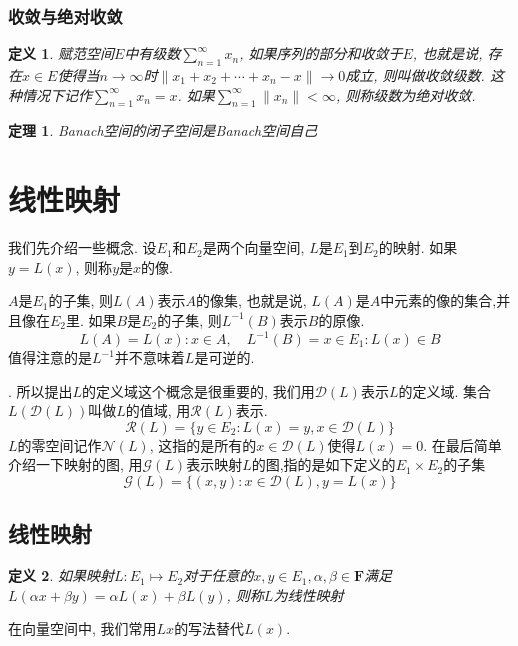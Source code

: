 \documentclass[a4paper,11pt]{book}
\newtheorem{definition}{\hspace{2em}定义}[section]
\newtheorem{theorem}{\hspace{2em}定理}[section]
\begin{document}
\subsubsection*{收敛与绝对收敛}
\begin{definition}
  赋范空间$E$中有级数$\sum_{n=1}^{\infty}x_n$, 如果序列的部分和收敛于$E$, 也就是说, 存在$x\in E$使得当$n\to\infty$时$\|x_1+x_2+\cdots+x_n-x\|\to0$成立, 则叫做收敛级数. 这种情况下记作$\sum_{n=1}^{\infty}x_n=x$. 如果$\sum_{n=1}^{\infty}\|x_n\|<\infty$, 则称级数为绝对收敛.
\end{definition}
\begin{theorem}
  Banach空间的闭子空间是Banach空间自己
\end{theorem}
\section{线性映射}
我们先介绍一些概念. 设$E_1$和$E_2$是两个向量空间, $L$是$E_1$到$E_2$的映射. 如果$y=L(x)$, 则称$y$是$x$的像.

$A$是$E_1$的子集, 则$L(A)$表示$A$的像集, 也就是说, $L(A)$是$A$中元素的像的集合,并且像在$E_2$里. 如果$B$是$E_2$的子集, 则$L^{-1}(B)$表示$B$的原像.
\begin{equation*}
  L(A)={L(x):x\in A},\quad L^{-1}(B)={x\in E_1:L(x)\in B}
\end{equation*}
值得注意的是$L^{-1}$并不意味着$L$是可逆的.

. 所以提出$L$的定义域这个概念是很重要的, 我们用$\mathcal{D}(L)$表示$L$的定义域. 集合$L(\mathcal{D}(L))$叫做$L$的值域, 用$\mathcal{R}(L)$表示.
\begin{equation*}
  \mathcal{R}(L)=\{y\in E_2:L(x)=y,x\in\mathcal{D}(L)\}
\end{equation*}
$L$的零空间记作$\mathcal{N}(L)$, 这指的是所有的$x\in \mathcal{D}(L)$使得$L(x)=0$. 在最后简单介绍一下映射的图, 用$\mathcal{G}(L)$表示映射$L$的图,指的是如下定义的$E_1\times E_2$的子集
\begin{equation*}
  \mathcal{G}(L)=\{(x,y):x\in\mathcal{D}(L),y=L(x)\}
\end{equation*}
\subsection*{线性映射}
\begin{definition}
  如果映射$L:E_1\mapsto E_2$对于任意的$x,y\in E_1,\alpha,\beta\in \mathbf{F}$满足$L(\alpha x+\beta y)=\alpha L(x)+\beta L(y)$, 则称$L$为线性映射
\end{definition}
在向量空间中, 我们常用$Lx$的写法替代$L(x)$.
\end{document}
